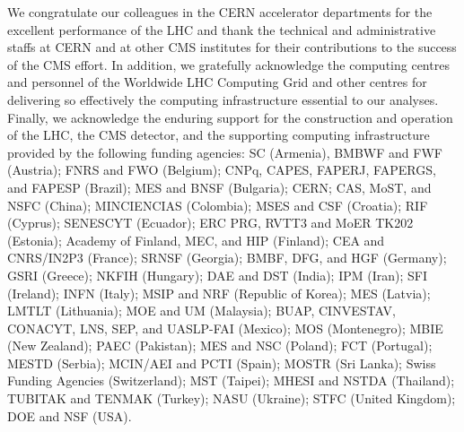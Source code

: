\begin{acknowledgments}
We congratulate our colleagues in the CERN accelerator departments for the excellent performance of the LHC and thank the technical and administrative staffs at CERN and at other CMS institutes for their contributions to the success of the CMS effort. In addition, we gratefully acknowledge the computing centres and personnel of the Worldwide LHC Computing Grid and other centres for delivering so effectively the computing infrastructure essential to our analyses. Finally, we acknowledge the enduring support for the construction and operation of the LHC, the CMS detector, and the supporting computing infrastructure provided by the following funding agencies: SC (Armenia), BMBWF and FWF (Austria); FNRS and FWO (Belgium); CNPq, CAPES, FAPERJ, FAPERGS, and FAPESP (Brazil); MES and BNSF (Bulgaria); CERN; CAS, MoST, and NSFC (China); MINCIENCIAS (Colombia); MSES and CSF (Croatia); RIF (Cyprus); SENESCYT (Ecuador); ERC PRG, RVTT3 and MoER TK202 (Estonia); Academy of Finland, MEC, and HIP (Finland); CEA and CNRS/IN2P3 (France); SRNSF (Georgia); BMBF, DFG, and HGF (Germany); GSRI (Greece); NKFIH (Hungary); DAE and DST (India); IPM (Iran); SFI (Ireland); INFN (Italy); MSIP and NRF (Republic of Korea); MES (Latvia); LMTLT (Lithuania); MOE and UM (Malaysia); BUAP, CINVESTAV, CONACYT, LNS, SEP, and UASLP-FAI (Mexico); MOS (Montenegro); MBIE (New Zealand); PAEC (Pakistan); MES and NSC (Poland); FCT (Portugal); MESTD (Serbia); MCIN/AEI and PCTI (Spain); MOSTR (Sri Lanka); Swiss Funding Agencies (Switzerland); MST (Taipei); MHESI and NSTDA (Thailand); TUBITAK and TENMAK (Turkey); NASU (Ukraine); STFC (United Kingdom); DOE and NSF (USA).



\end{acknowledgments}
